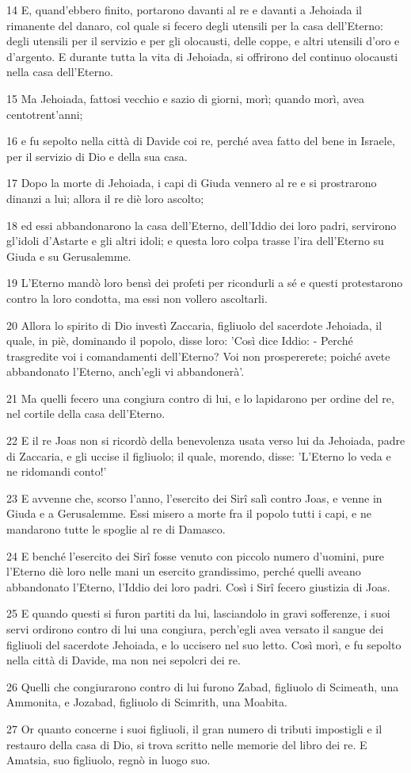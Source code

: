 \par 14 E, quand'ebbero finito, portarono davanti al re e davanti a Jehoiada il rimanente del danaro, col quale si fecero degli utensili per la casa dell'Eterno: degli utensili per il servizio e per gli olocausti, delle coppe, e altri utensili d'oro e d'argento. E durante tutta la vita di Jehoiada, si offrirono del continuo olocausti nella casa dell'Eterno.
\par 15 Ma Jehoiada, fattosi vecchio e sazio di giorni, morì; quando morì, avea centotrent'anni;
\par 16 e fu sepolto nella città di Davide coi re, perché avea fatto del bene in Israele, per il servizio di Dio e della sua casa.
\par 17 Dopo la morte di Jehoiada, i capi di Giuda vennero al re e si prostrarono dinanzi a lui; allora il re diè loro ascolto;
\par 18 ed essi abbandonarono la casa dell'Eterno, dell'Iddio dei loro padri, servirono gl'idoli d'Astarte e gli altri idoli; e questa loro colpa trasse l'ira dell'Eterno su Giuda e su Gerusalemme.
\par 19 L'Eterno mandò loro bensì dei profeti per ricondurli a sé e questi protestarono contro la loro condotta, ma essi non vollero ascoltarli.
\par 20 Allora lo spirito di Dio investì Zaccaria, figliuolo del sacerdote Jehoiada, il quale, in piè, dominando il popolo, disse loro: 'Così dice Iddio: - Perché trasgredite voi i comandamenti dell'Eterno? Voi non prospererete; poiché avete abbandonato l'Eterno, anch'egli vi abbandonerà'.
\par 21 Ma quelli fecero una congiura contro di lui, e lo lapidarono per ordine del re, nel cortile della casa dell'Eterno.
\par 22 E il re Joas non si ricordò della benevolenza usata verso lui da Jehoiada, padre di Zaccaria, e gli uccise il figliuolo; il quale, morendo, disse: 'L'Eterno lo veda e ne ridomandi conto!'
\par 23 E avvenne che, scorso l'anno, l'esercito dei Sirî salì contro Joas, e venne in Giuda e a Gerusalemme. Essi misero a morte fra il popolo tutti i capi, e ne mandarono tutte le spoglie al re di Damasco.
\par 24 E benché l'esercito dei Sirî fosse venuto con piccolo numero d'uomini, pure l'Eterno diè loro nelle mani un esercito grandissimo, perché quelli aveano abbandonato l'Eterno, l'Iddio dei loro padri. Così i Sirî fecero giustizia di Joas.
\par 25 E quando questi si furon partiti da lui, lasciandolo in gravi sofferenze, i suoi servi ordirono contro di lui una congiura, perch'egli avea versato il sangue dei figliuoli del sacerdote Jehoiada, e lo uccisero nel suo letto. Così morì, e fu sepolto nella città di Davide, ma non nei sepolcri dei re.
\par 26 Quelli che congiurarono contro di lui furono Zabad, figliuolo di Scimeath, una Ammonita, e Jozabad, figliuolo di Scimrith, una Moabita.
\par 27 Or quanto concerne i suoi figliuoli, il gran numero di tributi impostigli e il restauro della casa di Dio, si trova scritto nelle memorie del libro dei re. E Amatsia, suo figliuolo, regnò in luogo suo.

